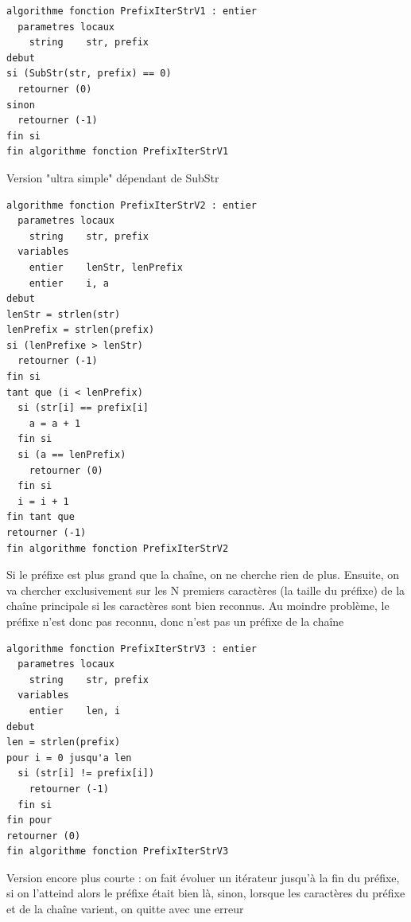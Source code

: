 \documentclass[11pt,a4paper]{article}
\begin{document}
\begin{table}[ht!]
  \centering
\begin{lstlisting}[style=algorithmique]
algorithme fonction PrefixIterStrV1 : entier
  parametres locaux
    string    str, prefix
debut
si (SubStr(str, prefix) == 0)
  retourner (0)
sinon
  retourner (-1)
fin si
fin algorithme fonction PrefixIterStrV1 \end{lstlisting}
  \caption{Version "ultra simple" dépendant de SubStr}
\end{table}

\vfillLast

\clearpage

\vfillFirst

\begin{table}[ht!]
  \centering
\begin{lstlisting}[style=algorithmique]
algorithme fonction PrefixIterStrV2 : entier
  parametres locaux
    string    str, prefix
  variables
    entier    lenStr, lenPrefix
    entier    i, a
debut
lenStr = strlen(str)
lenPrefix = strlen(prefix)
si (lenPrefixe > lenStr)
  retourner (-1)
fin si
tant que (i < lenPrefix)
  si (str[i] == prefix[i]
    a = a + 1
  fin si
  si (a == lenPrefix)
    retourner (0)
  fin si
  i = i + 1
fin tant que
retourner (-1)
fin algorithme fonction PrefixIterStrV2 \end{lstlisting}
  \caption{Si le préfixe est plus grand que la chaîne, on ne cherche rien de plus. Ensuite, on va chercher exclusivement sur les N premiers caractères (la taille du préfixe) de la chaîne principale si les caractères sont bien reconnus. Au moindre problème, le préfixe n'est donc pas reconnu, donc n'est pas un préfixe de la chaîne }
\end{table}

\vfillLast

\clearpage

\vfillFirst

\begin{table}[ht!]
  \centering
\begin{lstlisting}[style=algorithmique]
algorithme fonction PrefixIterStrV3 : entier
  parametres locaux
    string    str, prefix
  variables
    entier    len, i
debut
len = strlen(prefix)
pour i = 0 jusqu'a len
  si (str[i] != prefix[i])
    retourner (-1)
  fin si
fin pour
retourner (0)
fin algorithme fonction PrefixIterStrV3 \end{lstlisting}
  \caption{Version encore plus courte : on fait évoluer un itérateur jusqu'à la fin du préfixe, si on l'atteind alors le préfixe était bien là, sinon, lorsque les caractères du préfixe et de la chaîne varient, on quitte avec une erreur }
\end{table}
\end{document}
